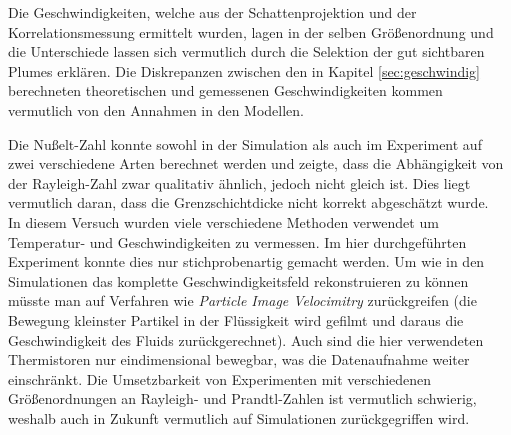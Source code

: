 \documentclass[12pt,a4paper,titlepage,headinclude]{scrartcl}
\numberwithin{equation}{subsection}
\begin{document}
Die Geschwindigkeiten, welche aus der Schattenprojektion und der Korrelationsmessung ermittelt wurden, lagen in der selben Größenordnung und die Unterschiede lassen sich vermutlich durch die Selektion der gut sichtbaren Plumes erklären.
Die Diskrepanzen zwischen den in Kapitel \ref{sec:geschwindig} berechneten theoretischen und gemessenen Geschwindigkeiten kommen vermutlich von den Annahmen in den Modellen.


Die Nußelt-Zahl konnte sowohl in der Simulation als auch im Experiment auf zwei verschiedene Arten berechnet werden und zeigte, dass die Abhängigkeit von der Rayleigh-Zahl zwar qualitativ ähnlich, jedoch nicht gleich ist.
Dies liegt vermutlich daran, dass die Grenzschichtdicke nicht korrekt abgeschätzt wurde.\\

In diesem Versuch wurden viele verschiedene Methoden verwendet um Temperatur- und Geschwindigkeiten zu vermessen.
Im hier durchgeführten Experiment konnte dies nur stichprobenartig gemacht werden.
Um wie in den Simulationen das komplette Geschwindigkeitsfeld rekonstruieren zu können müsste man auf Verfahren wie \textit{Particle Image Velocimitry} zurückgreifen (die Bewegung kleinster Partikel in der Flüssigkeit wird gefilmt und daraus die Geschwindigkeit des Fluids zurückgerechnet).
Auch sind die hier verwendeten Thermistoren nur eindimensional bewegbar, was die Datenaufnahme weiter einschränkt.
Die Umsetzbarkeit von Experimenten mit verschiedenen Größenordnungen an Rayleigh- und Prandtl-Zahlen ist vermutlich schwierig, weshalb auch in Zukunft vermutlich auf Simulationen zurückgegriffen wird.


\newpage
\printbibliography[heading=bibintoc]
\end{document}
